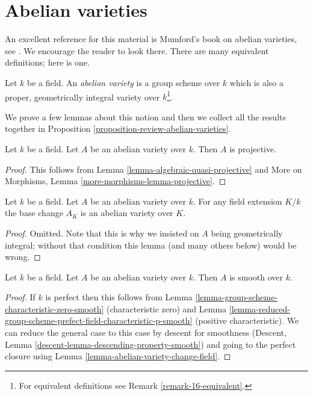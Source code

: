 \section{Abelian varieties}
\label{section-abelian-varieties}

\noindent
An excellent reference for this material is Mumford's book on
abelian varieties, see \cite{AVar}. We encourage the reader to
look there. There are many equivalent definitions; here is one.

\begin{definition}
\label{definition-abelian-variety}
Let $k$ be a field. An {\it abelian variety} is a group scheme over
$k$ which is also a proper, geometrically integral variety over
$k$\footnote{For equivalent definitions see Remark \ref{remark-16-equivalent}.}.
\end{definition}

\noindent
We prove a few lemmas about this notion and then we collect
all the results together in
Proposition \ref{proposition-review-abelian-varieties}.

\begin{lemma}
\label{lemma-abelian-variety-projective}
Let $k$ be a field. Let $A$ be an abelian variety over $k$.
Then $A$ is projective.
\end{lemma}

\begin{proof}
This follows from
Lemma \ref{lemma-algebraic-quasi-projective} and
More on Morphisms, Lemma \ref{more-morphisms-lemma-projective}.
\end{proof}

\begin{lemma}
\label{lemma-abelian-variety-change-field}
Let $k$ be a field. Let $A$ be an abelian variety over $k$.
For any field extension $K/k$ the base change $A_K$ is an
abelian variety over $K$.
\end{lemma}

\begin{proof}
Omitted. Note that this is why we insisted on $A$ being
geometrically integral; without that condition this lemma
(and many others below) would be wrong.
\end{proof}

\begin{lemma}
\label{lemma-abelian-variety-smooth}
Let $k$ be a field. Let $A$ be an abelian variety over $k$.
Then $A$ is smooth over $k$.
\end{lemma}

\begin{proof}
If $k$ is perfect then this follows from
Lemma \ref{lemma-group-scheme-characteristic-zero-smooth}
(characteristic zero) and
Lemma \ref{lemma-reduced-group-scheme-prefect-field-characteristic-p-smooth}
(positive characteristic).
We can reduce the general case to this case by descent for smoothness
(Descent, Lemma \ref{descent-lemma-descending-property-smooth})
and going to the perfect closure using
Lemma \ref{lemma-abelian-variety-change-field}.
\end{proof}


